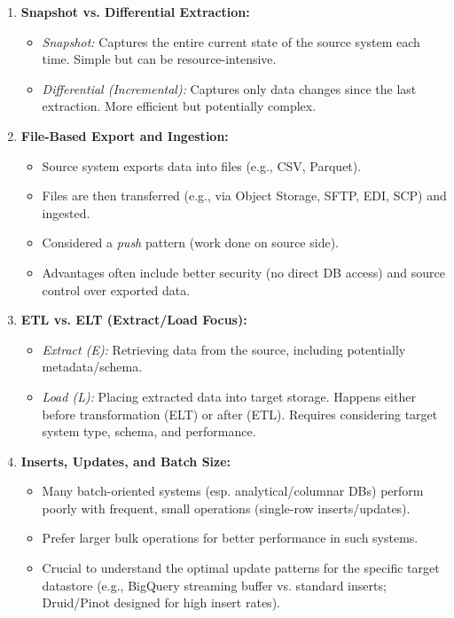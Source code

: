 \begin{enumerate}
    \item \textbf{Snapshot vs. Differential Extraction:}
    \begin{itemize}[label=\textbullet]
        \item \textit{Snapshot:} Captures the entire current state of the source system each time. Simple but can be resource-intensive.
        \item \textit{Differential (Incremental):} Captures only data changes since the last extraction. More efficient but potentially complex.
    \end{itemize}

    \item \textbf{File-Based Export and Ingestion:}
    \begin{itemize}[label=\textbullet]
        \item Source system exports data into files (e.g., CSV, Parquet).
        \item Files are then transferred (e.g., via Object Storage, SFTP, EDI, SCP) and ingested.
        \item Considered a \textit{push} pattern (work done on source side).
        \item Advantages often include better security (no direct DB access) and source control over exported data.
    \end{itemize}

    \item \textbf{ETL vs. ELT (Extract/Load Focus):}
    \begin{itemize}[label=\textbullet]
        \item \textit{Extract (E):} Retrieving data from the source, including potentially metadata/schema.
        \item \textit{Load (L):} Placing extracted data into target storage. Happens either before transformation (ELT) or after (ETL). Requires considering target system type, schema, and performance.
    \end{itemize}

    \item \textbf{Inserts, Updates, and Batch Size:}
    \begin{itemize}[label=\textbullet]
        \item Many batch-oriented systems (esp. analytical/columnar DBs) perform poorly with frequent, small operations (single-row inserts/updates).
        \item Prefer larger bulk operations for better performance in such systems.
        \item Crucial to understand the optimal update patterns for the specific target datastore (e.g., BigQuery streaming buffer vs. standard inserts; Druid/Pinot designed for high insert rates).
    \end{itemize}


\end{enumerate}
